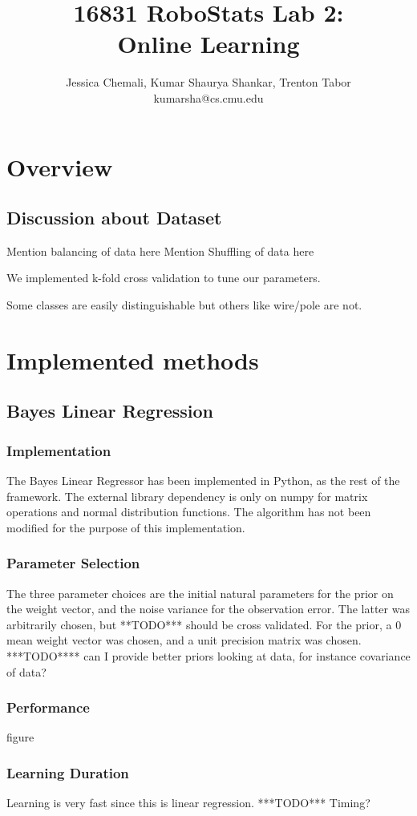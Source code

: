 \documentclass[10pt,a4paper]{article}
\author{Jessica Chemali, Kumar Shaurya Shankar, Trenton Tabor\\kumarsha@cs.cmu.edu}
\title{16831 RoboStats Lab 2: \\Online Learning}
\begin{document}
\maketitle
\section{Overview}
\subsection{Discussion about Dataset}
Mention balancing of data here
Mention Shuffling of data here

We implemented k-fold cross validation to tune our parameters.

Some classes are easily distinguishable but others like wire/pole are not.
\section{Implemented methods}
\subsection{Bayes Linear Regression}
\subsubsection{Implementation}
The Bayes Linear Regressor has been implemented in Python, as the rest of the framework. The external library dependency is only on numpy for matrix operations and normal distribution functions. The algorithm has not been modified for the purpose of this implementation.
\subsubsection{Parameter Selection}
The three parameter choices are the initial natural parameters for the prior on the weight vector, and the noise variance for the observation error. The latter was arbitrarily chosen, but **TODO*** should be cross validated. For the prior, a 0 mean weight vector was chosen, and a unit precision matrix was chosen. ***TODO**** can I provide better priors looking at data, for instance covariance of data?
\subsubsection{Performance}
figure

\subsubsection{Learning Duration}
Learning is very fast since this is linear regression. ***TODO*** Timing?
\end{document}
